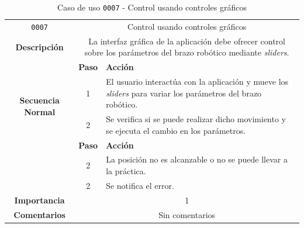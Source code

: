 \begin{table}[H]
    \centering
    \begin{tabularx}{\textwidth}{|c|c|X|}
        \cline{1-3}
        \texttt{0007}        & \multicolumn{2}{c|}{Control usando controles gráficos}                                      
        \\ \cline{1-3}
        \textbf{Descripción} & \multicolumn{2}{m{13cm}|}{La interfaz gráfica de la aplicación debe ofrecer control sobre los parámetros del brazo robótico mediante \textit{sliders}.}
        \\ \cline{1-3}
        \multirow{4}{*}{\textbf{Secuencia Normal}} & \textbf{Paso} & \textbf{Acción}
        \\ \cline{2-3}                    &   1  & El usuario interactúa con la aplicación y mueve los \textit{sliders} para variar los parámetros del brazo robótico.
        \\ \cline{2-3}                    &   2  & Se verifica si se puede realizar dicho movimiento y se ejecuta el cambio en los parámetros.
        \\ \cline{1-3}
        \multirow{2}{*}{\textbf{Excepciones}} & \textbf{Paso} & \textbf{Acción}
        \\ \cline{2-3}                    &   2   &  La posición no es alcanzable o no se puede llevar a la práctica.
        \\ \cline{2-3}                    &   2   &  Se notifica el error.
        \\ \cline{1-3}
        \textbf{Importancia}                 & \multicolumn{2}{c|}{1}           
        \\ \cline{1-3}
        \textbf{Comentarios}                 & \multicolumn{2}{c|}{Sin comentarios}
        \\ \cline{1-3}
    \end{tabularx}
    \caption{Caso de uso \texttt{0007} - Control usando controles gráficos}
\end{table}

